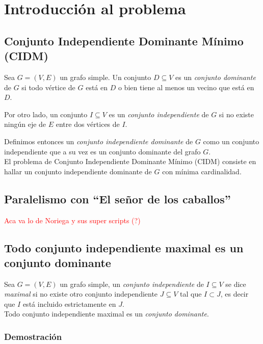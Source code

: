 \section{Introducci\'on al problema}
\subsection{Conjunto Independiente Dominante M\'inimo (CIDM)}

Sea $G = (V, E)$ un grafo simple. Un conjunto $D \subseteq V$ es un \emph{conjunto dominante} de $G$ si todo v\'ertice de $G$ est\'a en $D$ o bien tiene al menos un vecino que est\'a en $D$. 

Por otro lado, un conjunto $I \subseteq V$ es un \emph{conjunto independiente} de $G$ si no existe ning\'un eje de $E$ entre dos v\'ertices de $I$. 

Definimos entonces un \emph{conjunto independiente dominante} de $G$ como un conjunto independiente que a su vez es un conjunto dominante del grafo $G$.\\

El problema de Conjunto Independiente Dominante M\'inimo (CIDM) consiste en hallar un conjunto independiente dominante de $G$ con m\'inima cardinalidad.

\subsection{Paralelismo con ``El se\~nor de los caballos''}

\textcolor{red}{Aca va lo de Noriega y sus super scripts (?)}

\subsection{Todo conjunto independiente maximal es un conjunto dominante}

 Sea $G = (V, E)$ un grafo simple, un \emph{conjunto independiente} de $I \subseteq V$ se dice \emph{maximal} si no existe otro conjunto independiente $J \subseteq V$ tal que $I \subset J$, es decir que $I$ est\'a incluido estrictamente en $J$. \\
 
 Todo conjunto independiente maximal es un \emph{conjunto dominante}.
 
\subsubsection*{Demostraci\'on}

